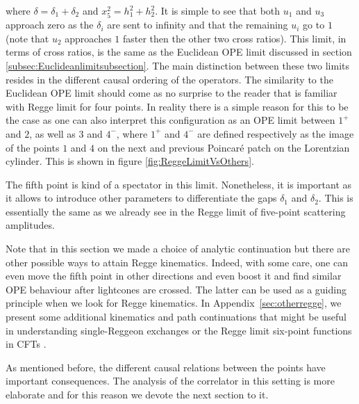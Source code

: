 where  $\delta=\delta_{1}+\delta_2$ and $x_5^2=h_1^2+h_2^2$. It is simple to see that both $u_1$ and $u_3$ approach zero as the $\delta_i$ are sent to infinity and that the remaining $u_i$ go to $1$
(note that $u_2$ approaches $1$ faster then the other two cross ratios). This limit, in terms of cross ratios, is the same as the Euclidean OPE limit discussed in section \ref{subsec:Euclideanlimitsubsection}.  The main distinction between these two limits resides in the different causal ordering of the operators. The similarity to the Euclidean OPE limit should come as  no surprise to the reader that is familiar with Regge limit for four points.
In reality there is a simple reason for this to be the case as one can also interpret this configuration as an OPE limit between $1^+$ and $2$, as well as $3$ and $4^-$, where  $1^+$ and $4^-$ are defined
respectively as the image of the points $1$ and $4$ on the next and previous Poincar\'e patch on the Lorentzian cylinder. This is shown in  figure \ref{fig:ReggeLimitVsOthers}.

The fifth point is kind of a spectator in this limit.
Nonetheless, it is important as it allows to introduce other parameters to differentiate the gaps $\delta_1$ and $\delta_2$.
This is essentially the same as we already see in the Regge limit of five-point scattering amplitudes.

Note that in this section we made a choice of analytic continuation but there are other possible ways to attain Regge kinematics. Indeed, with some care, one can even move the fifth point in other directions and even boost it and find similar OPE behaviour after lightcones are crossed. The latter can be used as a guiding principle when we look for Regge kinematics. In Appendix~\ref{sec:otherregge}, we present some additional kinematics and path continuations that might be useful in understanding single-Reggeon exchanges or the Regge limit six-point functions in CFTs .


As mentioned before, the different causal relations between the points have important consequences. The analysis of the correlator in this setting is more elaborate and for this reason we devote the next section to it.


